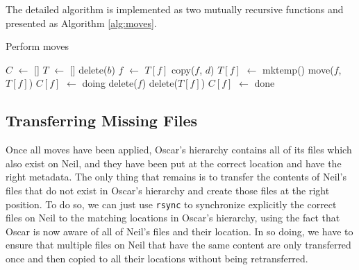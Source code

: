 \documentclass[twoside,envcountsame,runningheads]{llncs}
\newcommand*\Let[2]{\State #1 $\gets$ #2}
\newcommand{\rsync}{\texttt{rsync}\xspace}
\begin{document}
The detailed algorithm is implemented as two mutually recursive functions and presented as Algorithm \ref{alg:moves}.

\begin{algorithm}[t]
  \caption{Perform moves}
  \label{alg:moves}
  \begin{algorithmic}[1]
    \Statex
    \Let{$C$}{[]} 
    \Let{$T$}{[]} 
          \State delete($b$) 
        \Else
          \State {} 
        \EndIf
      \EndIf
        \Let{$f$}{$T[f]$}
      \EndIf
      \State copy($f$, $d$)
    \EndFunction
        \State \Return {}
      \EndIf
          \Let{$T[f]$}{mktemp()}
          \State move($f$, $T[f]$)
        \EndIf
        \State \Return {}
      \EndIf
      \Let{$C[f]$}{doing}
        \State {} 
      \EndFor
        \State delete($f$)
      \EndIf
        \State delete($T[f]$)
      \EndIf
      \Let{$C[f]$}{done}
    \EndFunction

      \State {}
    \EndFor
  \end{algorithmic}
\end{algorithm}

\subsection{Transferring Missing Files}
\label{sec:transferring}

Once all moves have been applied, Oscar's hierarchy contains all of its files
which also exist on Neil, and they have been put at the correct location and have the right metadata. The
only thing that remains is to transfer the contents of Neil's files that do not
exist in Oscar's hierarchy and create those files at the right position. To do
so, we can just use \rsync to synchronize explicitly the correct
files on Neil to the matching locations in Oscar's hierarchy, using the fact that
Oscar is now aware of all of Neil's files and their location. In so doing, we have to ensure that multiple files on Neil that have the same content are only transferred once and then copied to all their locations without being retransferred.
\end{document}
